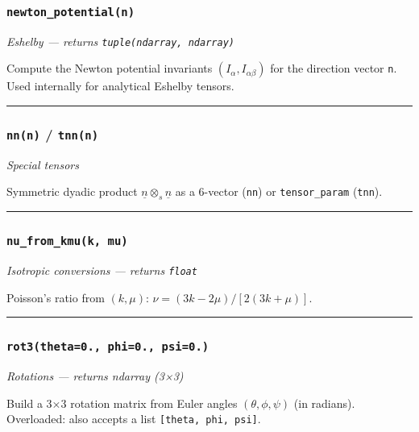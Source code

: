 \documentclass[
  a4paper,
  numbers=noendperiod,
  DIV=12]{scrreprt}
\newcommand{\uv}[1]{{\underline{{#1}}}}
\begin{document}
\subsubsection{\texorpdfstring{\texttt{newton\_potential(n)}}{newton\_potential(n)}}\label{api-newton-potential}

\emph{Eshelby --- returns \texttt{tuple(ndarray,\ ndarray)}}

Compute the Newton potential invariants
\((I_{\alpha}, I_{\alpha\beta})\) for the direction vector \texttt{n}.
Used internally for analytical Eshelby tensors.

\begin{center}\rule{0.5\linewidth}{0.5pt}\end{center}

\subsubsection{\texorpdfstring{\texttt{nn(n)} /
\texttt{tnn(n)}}{nn(n) / tnn(n)}}\label{api-nn}

\emph{Special tensors}

Symmetric dyadic product \(\uv{n}\otimes_s\uv{n}\) as a 6-vector
(\texttt{nn}) or \texttt{tensor\_param} (\texttt{tnn}).

\begin{center}\rule{0.5\linewidth}{0.5pt}\end{center}

\subsubsection{\texorpdfstring{\texttt{nu\_from\_kmu(k,\ mu)}}{nu\_from\_kmu(k, mu)}}\label{api-nu-from-kmu}

\emph{Isotropic conversions --- returns \texttt{float}}

Poisson's ratio from \((k,\mu)\): \(\nu = (3k-2\mu)/[2(3k+\mu)]\).

\begin{center}\rule{0.5\linewidth}{0.5pt}\end{center}

\subsubsection{\texorpdfstring{\texttt{rot3(theta=0.,\ phi=0.,\ psi=0.)}}{rot3(theta=0., phi=0., psi=0.)}}\label{api-rot3}

\emph{Rotations --- returns ndarray (3×3)}

Build a 3×3 rotation matrix from Euler angles \((\theta,\phi,\psi)\) (in
radians). Overloaded: also accepts a list
\texttt{{[}theta,\ phi,\ psi{]}}.
\end{document}
